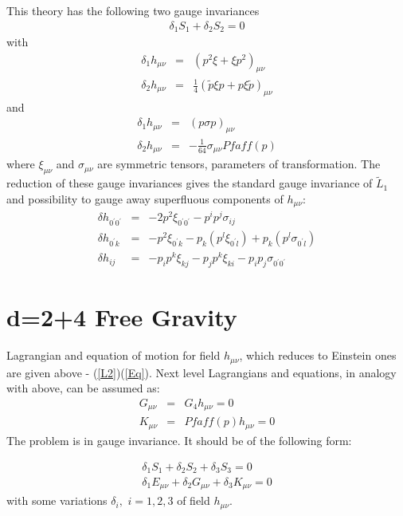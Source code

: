 \documentclass[a4paper,12pt]{article}
\begin{document}
This theory has the following two gauge invariances
\begin{eqnarray}
\delta _1 S_1  + \delta _2 S_2  = 0 \label{22}
\end{eqnarray}
with
\begin{eqnarray}
\delta _{1}h_{\mu \nu } &=&(p^{2}\xi +\xi p^{2})_{\mu \nu } \label{221}\\
\delta _{2}h_{\mu \nu } &=&\frac{1}{4}( \widetilde{p}\xi p+p\xi
\widetilde{p})_{\mu \nu }
\end{eqnarray}
and
\begin{eqnarray}
\delta _{1}h_{\mu \nu } &=&(p\sigma p)_{\mu \nu } \label{222}\\
\delta _{2}h_{\mu \nu } &=&-\frac{1}{64}\sigma _{\mu \nu }Pfaff(p)
\end{eqnarray}
where $\xi_{\mu \nu }$ and $\sigma_{\mu \nu }$ are symmetric
tensors, parameters of transformation. The reduction of these
gauge invariances gives the standard gauge invariance of
$\widetilde{L}_{1}$ and possibility to gauge away superfluous
components of $h_{\mu \nu }$:
\begin{eqnarray}
\delta h_{0^{\prime }0^{\prime }}&=&-2p^{2}\xi _{0^{\prime
}0^{\prime }}-p^{i}p^{j}\sigma_{ij}\\
 \delta h_{0^{\prime
}k}&=&-p^{2}\xi _{0^{\prime }k}-p_{k}( p^{l}\xi _{0^{\prime
}l})+p_{k}( p^{l}\sigma _{0^{\prime}l})\\
 \delta h_{ij}&=&-p_{i}p^{k}\xi
_{kj}-p_{j}p^{k}\xi _{ki}-p_{i}p_{j}\sigma _{0^{\prime }0^{\prime
}}
\end{eqnarray}

\bigskip

\section{d=2+4 Free Gravity\newline}

    Lagrangian and equation of motion for field $h_{\mu \nu }$, which
reduces to Einstein ones are given above - (\ref{L2})(\ref{Eq}).
Next level Lagrangians and equations, in analogy with above, can
be assumed as:
\bigskip
\begin{eqnarray}
G_{\mu \nu } &=&G_{4}h_{\mu \nu }=0  \label{Eq62} \\
K_{\mu \nu } &=&Pfaff(p)h_{\mu \nu }=0  \label{Eq63}
\end{eqnarray}
The problem is in gauge invariance. It should be of the following
form:

\begin{eqnarray}
\delta _1 S_1  + \delta _2 S_2  + \delta _3 S_3  = 0 \\
 \delta_{1}E_{\mu \nu }+\delta _{2}G_{\mu \nu }+\delta _{3}K_{\mu \nu }=0
\end{eqnarray}
with some variations $\delta _{i},$ $i=1,2,3$ of field
$h_{\mu\nu}$.
\end{document}
